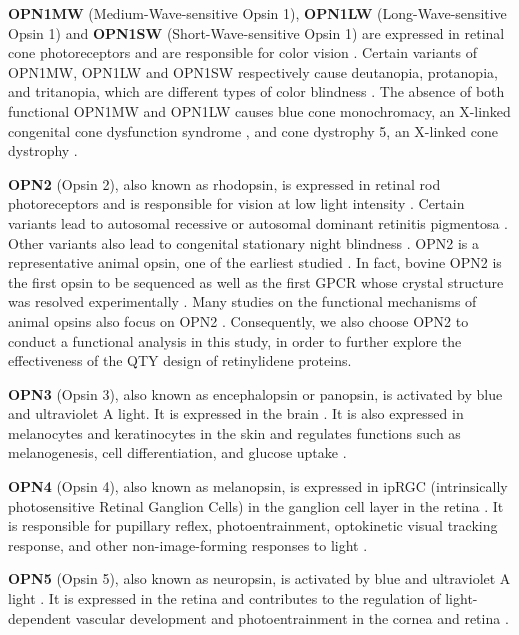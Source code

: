 \documentclass[fleqn,10pt]{manuscript}
\begin{document}
\textbf{OPN1MW} (Medium-Wave-sensitive Opsin 1), \textbf{OPN1LW} (Long-Wave-sensitive Opsin 1) and \textbf{OPN1SW} (Short-Wave-sensitive Opsin 1) are expressed in retinal cone photoreceptors and are responsible for color vision \citep{Bowmaker_1980}. Certain variants of OPN1MW, OPN1LW and OPN1SW respectively cause deutanopia, protanopia, and tritanopia, which are different types of color blindness \citep{Ueyama_2002, Baraas_2012}. The absence of both functional OPN1MW and OPN1LW causes blue cone monochromacy, an X-linked congenital cone dysfunction syndrome \citep{Wissinger_2022}, and cone dystrophy 5, an X-linked cone dystrophy \citep{Gardner_2010}. 

\textbf{OPN2} (Opsin 2), also known as rhodopsin, is expressed in retinal rod photoreceptors and is responsible for vision at low light intensity \citep{Hubbard_1958}. Certain variants lead to autosomal recessive or autosomal dominant retinitis pigmentosa \citep{Fanelli_2021}. Other variants also lead to congenital stationary night blindness \citep{Fanelli_2021}. OPN2 is a representative animal opsin, one of the earliest studied \citep{Hubbard_1958}. In fact, bovine OPN2 is the first opsin to be sequenced \citep{Nathans_1984} as well as the first GPCR whose crystal structure was resolved experimentally \citep{Palczeski_2000}. Many studies on the functional mechanisms of animal opsins also focus on OPN2 \citep{Park_2008, Scheerer_2008, Kimata_2016}. Consequently, we also choose OPN2 to conduct a functional analysis in this study, in order to further explore the effectiveness of the QTY design of retinylidene proteins. 

\textbf{OPN3} (Opsin 3), also known as encephalopsin or panopsin, is activated by blue and ultraviolet A light. It is expressed in the brain \citep{Blackshaw_1999}. It is also expressed in melanocytes and keratinocytes in the skin and regulates functions such as melanogenesis, cell differentiation, and glucose uptake \citep{Koyanagi_2013, Olinski_2020}. 

\textbf{OPN4} (Opsin 4), also known as melanopsin, is expressed in ipRGC (intrinsically photosensitive Retinal Ganglion Cells) in the ganglion cell layer in the retina \citep{Provencio_1998}. It is responsible for pupillary reflex, photoentrainment, optokinetic visual tracking response, and other non-image-forming responses to light \citep{Berson_2002, Gooley_2003}. 

\textbf{OPN5} (Opsin 5), also known as neuropsin, is activated by blue and ultraviolet A light \citep{Tarttelin_2003, Yamashita_2010}. It is expressed in the retina and contributes to the regulation of light-dependent vascular development \citep{Nguyen_2019} and photoentrainment in the cornea and retina \citep{Buhr_2015}. 
\end{document}
